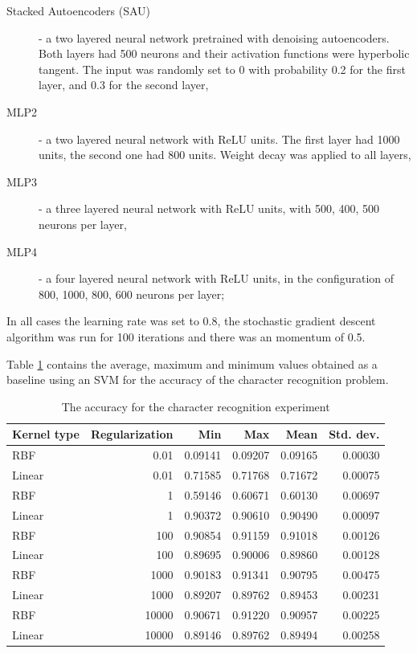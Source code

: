 \begin{description}


\item[Stacked Autoencoders (SAU)] - a two layered neural network pretrained with denoising autoencoders. Both layers had 500 neurons and their activation functions were hyperbolic tangent.  The input was randomly set to 0 with probability 0.2 for the first layer, and 0.3 for the second layer,
\item[MLP2] - a two layered neural network with ReLU units. The first layer had 1000 units, the second one had 800 units. Weight decay was applied to all layers,
\item[MLP3] - a three layered neural network with ReLU units, with 500, 400, 500 neurons per layer,
\item[MLP4] - a four layered neural network with ReLU units, in the configuration of 800, 1000, 800, 600 neurons per layer;
\end{description}

In all cases the learning rate was set to 0.8, the stochastic gradient descent algorithm was run for 100 iterations and there was an momentum of 0.5.

Table \ref{table:recog_values} contains the average, maximum and minimum values obtained as a baseline using an SVM for the accuracy of the character recognition problem.

\begin{table}[h]
\caption{The accuracy for the character recognition experiment}
\label{table:recog_values}
\begin{tabular}{lrrrrr}
\toprule
Kernel type & Regularization & Min     & Max     & Mean    & Std. dev. \\ 
\midrule
RBF & 0.01 & 0.09141 & 0.09207 & 0.09165 & 0.00030 \\ 
Linear & 0.01 & 0.71585 & 0.71768 & 0.71672 & 0.00075 \\ 
RBF & 1 & 0.59146 & 0.60671 & 0.60130 & 0.00697 \\ 
Linear & 1 & 0.90372 & 0.90610 & 0.90490 & 0.00097 \\ 
RBF & 100 & 0.90854 & 0.91159 & 0.91018 & 0.00126 \\ 
Linear & 100 & 0.89695 & 0.90006 & 0.89860 & 0.00128 \\ 
RBF & 1000 & 0.90183 & 0.91341 & 0.90795 & 0.00475 \\ 
Linear & 1000 & 0.89207 & 0.89762 & 0.89453 & 0.00231 \\ 
RBF & 10000 & 0.90671 & 0.91220 & 0.90957 & 0.00225 \\ 
Linear & 10000 & 0.89146 & 0.89762 & 0.89494 & 0.00258 \\ 
\bottomrule
\end{tabular}
\end{table}

